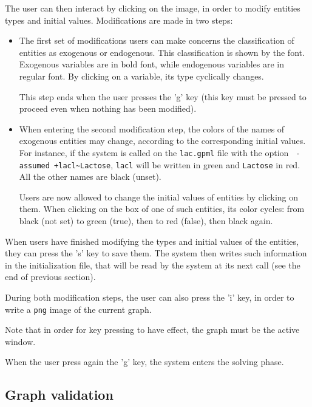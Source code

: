 \documentclass[a4paper]{article}
\begin{document}
The user can then
interact by clicking on the image, in order to modify entities types
and initial values.
Modifications are made in two steps:
\begin{itemize}
\item The first set of modifications  users can make concerns the
  classification of entities as exogenous or endogenous.
 This classification is shown by the font. Exogenous variables are in
 bold font, while endogenous variables are in regular font. 
 By clicking on a variable, its type cyclically changes.

This step ends when the user presses the 'g' key (this key must be
pressed to proceed even when nothing has been modified).

\item When entering the second modification step, the colors of the
  names of
  exogenous entities  may
  change, according to the corresponding initial values. For instance,
  if the system is called on the {\tt lac.gpml} file with the option {\tt
    -assumed +lacl{\textasciitilde}Lactose}, {\tt lacl} will be written in green and
  {\tt Lactose} in red. All the other names are black (unset).

Users are now allowed to change the initial values of %
entities by clicking on them. When clicking on the box of one of such entities, 
 its color cycles: from black (not set) to green (true), then
to red (false), then black again.
\end{itemize}
When  users have finished modifying the types and initial values of
the entities, they can press the 's' key to save them. The system then
writes such information in the initialization file, that will be read
by the system at its next call (see the end of previous section).

During both modification steps, the user 
can also press the 'i' key, in order to write a {\tt png} image of the
current graph.

Note that in order for key pressing to have effect, the graph must be
the active window. 

When the user press again the 'g' key, the system enters the solving
phase. 

\subsection{Graph validation}
\end{document}
